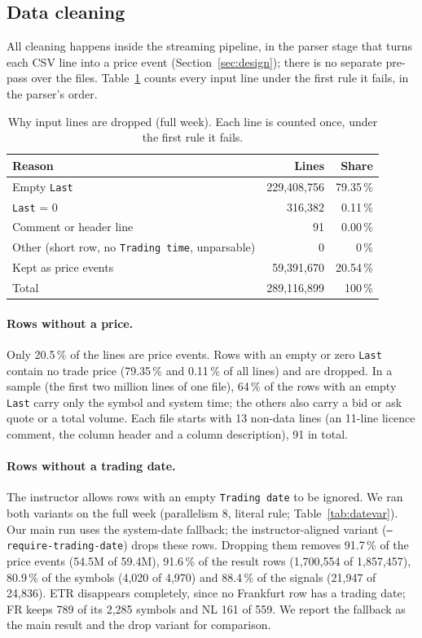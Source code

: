 \documentclass[sigconf,nonacm]{acmart}
\begin{document}
\subsection{Data cleaning}\label{sec:cleaning}
All cleaning happens inside the streaming pipeline, in the parser stage that
turns each CSV line into a price event (Section~\ref{sec:design}); there is no
separate pre-pass over the files. Table~\ref{tab:drop} counts every input line
under the first rule it fails, in the parser's order.

\begin{table}[t]
\caption{Why input lines are dropped (full week). Each line is counted once,
under the first rule it fails.}\label{tab:drop}
\small
\begin{tabular}{lrr}
\toprule
Reason & Lines & Share \\
\midrule
Empty \texttt{Last}                       & 229,408,756 & 79.35\,\% \\
\texttt{Last} = 0                         &     316,382 &  0.11\,\% \\
Comment or header line                    &          91 &  0.00\,\% \\
Other (short row, no \texttt{Trading time}, unparsable) & 0 & 0\,\% \\
\midrule
Kept as price events                      &  59,391,670 & 20.54\,\% \\
\midrule
Total                                     & 289,116,899 & 100\,\% \\
\bottomrule
\end{tabular}
\end{table}

\paragraph{Rows without a price.} Only 20.5\,\% of the lines are price
events. Rows with an empty or zero \texttt{Last} contain no trade price
(79.35\,\% and 0.11\,\% of all lines) and are dropped. In a sample (the first
two million lines of one file), 64\,\% of the rows with an empty \texttt{Last}
carry only the symbol and system time; the others also carry a bid or ask
quote or a total volume. Each file starts with 13 non-data lines (an 11-line
licence comment, the column header and a column description), 91 in total.

\paragraph{Rows without a trading date.} The instructor allows rows with an
empty \texttt{Trading date} to be ignored. We ran both variants on the full
week (parallelism 8, literal rule; Table~\ref{tab:datevar}). Our main run uses
the system-date fallback; the instructor-aligned variant
(\texttt{--require-trading-date}) drops these rows. Dropping them removes
91.7\,\% of the price events (54.5M of 59.4M), 91.6\,\% of the result rows
(1,700,554 of 1,857,457), 80.9\,\% of the symbols (4,020 of 4,970) and
88.4\,\% of the signals (21,947 of 24,836). ETR disappears completely, since
no Frankfurt row has a trading date; FR keeps 789 of its 2,285 symbols and NL
161 of 559. We report the fallback as the main result and the drop variant
for comparison.
\end{document}
